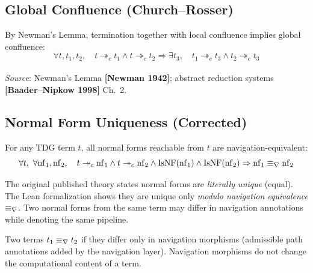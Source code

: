 \subsection{Global Confluence (Church--Rosser)}

\begin{theorem}[Confluence]
By Newman's Lemma, termination together with local confluence implies global
confluence:
\[
  \forall t, t_1, t_2,\quad
  t \twoheadrightarrow_c t_1 \wedge t \twoheadrightarrow_c t_2
  \Rightarrow
  \exists t_3,\quad
  t_1 \twoheadrightarrow_c t_3 \wedge t_2 \twoheadrightarrow_c t_3
\]
\\
\emph{Source}: Newman's Lemma \textbf{[Newman 1942]}; abstract reduction systems
\textbf{[Baader--Nipkow 1998]} Ch.~2.
\end{theorem}

\subsection{Normal Form Uniqueness (Corrected)}

\begin{theorem}
For any TDG term $t$, all normal forms reachable from $t$ are navigation-equivalent:
\[
  \forall t,\ \forall \mathrm{nf}_1, \mathrm{nf}_2,\quad
  t \twoheadrightarrow_c \mathrm{nf}_1
  \wedge t \twoheadrightarrow_c \mathrm{nf}_2
  \wedge \mathrm{IsNF}(\mathrm{nf}_1)
  \wedge \mathrm{IsNF}(\mathrm{nf}_2)
  \Rightarrow
  \mathrm{nf}_1 \navequiv \mathrm{nf}_2
\]
\end{theorem}

\begin{correction}
The original published theory states normal forms are \emph{literally unique}
(equal). The Lean formalization shows they are unique only \emph{modulo navigation
equivalence} $\equiv_\nabla$. Two normal forms from the same term may differ in
navigation annotations while denoting the same pipeline.
\end{correction}

\begin{definition}
Two terms $t_1 \equiv_\nabla t_2$ if they differ only in navigation morphisms
(admissible path annotations added by the navigation layer). Navigation
morphisms do not change the computational content of a term.
\end{definition}

